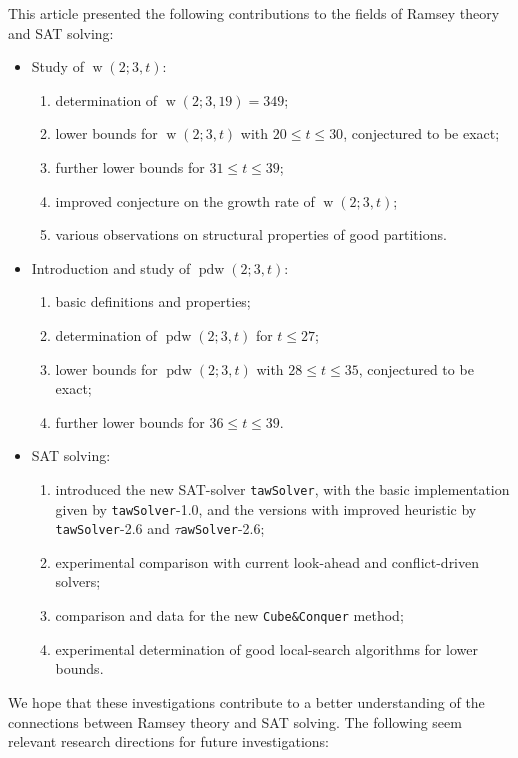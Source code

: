 \documentclass[final,3p,times]{elsarticle}
\theoremstyle{definition}
\renewcommand{\leq}{\le} %
\newcommand{\tawsolver}{\texttt{tawSolver}}
\newcommand{\otawsolver}{\tawsolver-1.0}
\newcommand{\ntawsolver}{\tawsolver-2.6}
\newcommand{\ttawsolver}{$\tau$\texttt{awSolver}-2.6}
\newcommand{\cubeconq}{\texttt{Cube\:\&\:Conquer}}
\DeclareMathOperator{\vdw}{w}
\DeclareMathOperator{\vdwpd}{pdw}
\begin{document}
This article presented the following contributions to the fields of Ramsey theory and SAT solving:
\begin{itemize}
\item Study of $\vdw(2;3,t)$:
  \begin{enumerate}
  \item determination of $\vdw(2;3,19) = 349$;
  \item lower bounds for $\vdw(2;3,t)$ with $20 \leq t \leq 30$, conjectured to be exact;
  \item further lower bounds for $31 \leq t \leq 39$;
  \item improved conjecture on the growth rate of $\vdw(2;3,t)$;
  \item various observations on structural properties of good partitions.
  \end{enumerate}
\item Introduction and study of $\vdwpd(2;3,t)$:
  \begin{enumerate}
  \item basic definitions and properties;
  \item determination of $\vdwpd(2;3,t)$ for $t \leq 27$;
  \item lower bounds for $\vdwpd(2;3,t)$ with $28 \leq t \leq 35$, conjectured to be exact;
  \item further lower bounds for $36 \leq t \leq 39$.
  \end{enumerate}
\item SAT solving:
  \begin{enumerate}
  \item introduced the new SAT-solver \tawsolver, with the basic implementation given by \otawsolver, and the versions with improved heuristic by \ntawsolver{} and \ttawsolver;
  \item experimental comparison with current look-ahead and conflict-driven solvers;
  \item comparison and data for the new \cubeconq{} method;
  \item experimental determination of good local-search algorithms for lower bounds.
  \end{enumerate}
\end{itemize}
We hope that these investigations contribute to a better understanding of the connections between Ramsey theory and SAT solving. The following seem relevant research directions for future investigations:
\end{document}
